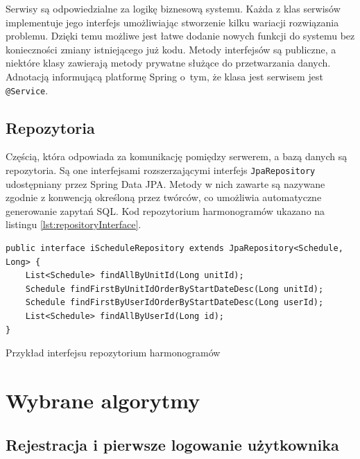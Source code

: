 Serwisy są odpowiedzialne za logikę biznesową systemu. Każda z klas serwisów implementuje jego interfejs umożliwiając stworzenie kilku wariacji rozwiązania problemu. Dzięki temu możliwe jest łatwe dodanie nowych funkcji do systemu bez konieczności zmiany istniejącego już kodu. Metody interfejsów są publiczne, a niektóre klasy zawierają metody prywatne służące do przetwarzania danych. Adnotacją informującą platformę Spring o~tym, że klasa jest serwisem jest \texttt{@Service}.

\subsection{Repozytoria}

Częścią, która odpowiada za komunikację pomiędzy serwerem, a bazą danych są repozytoria. Są one interfejsami rozszerzającymi interfejs \texttt{JpaRepository} udostępniany przez Spring Data JPA. Metody w nich zawarte są nazywane zgodnie z konwencją określoną przez twórców, co umożliwia automatyczne generowanie zapytań SQL. Kod repozytorium harmonogramów ukazano na listingu \ref{lst:repositoryInterface}.

\begin{listing}[H]
    \begin{verbatim}
public interface iScheduleRepository extends JpaRepository<Schedule, Long> {
    List<Schedule> findAllByUnitId(Long unitId);
    Schedule findFirstByUnitIdOrderByStartDateDesc(Long unitId);
    Schedule findFirstByUserIdOrderByStartDateDesc(Long userId);
    List<Schedule> findAllByUserId(Long id);
}
\end{verbatim}
    \caption{Przykład interfejsu repozytorium harmonogramów}
    \label{lst:repositoryInterface}
\end{listing}

\section{Wybrane algorytmy}

\subsection{Rejestracja i pierwsze logowanie użytkownika}

